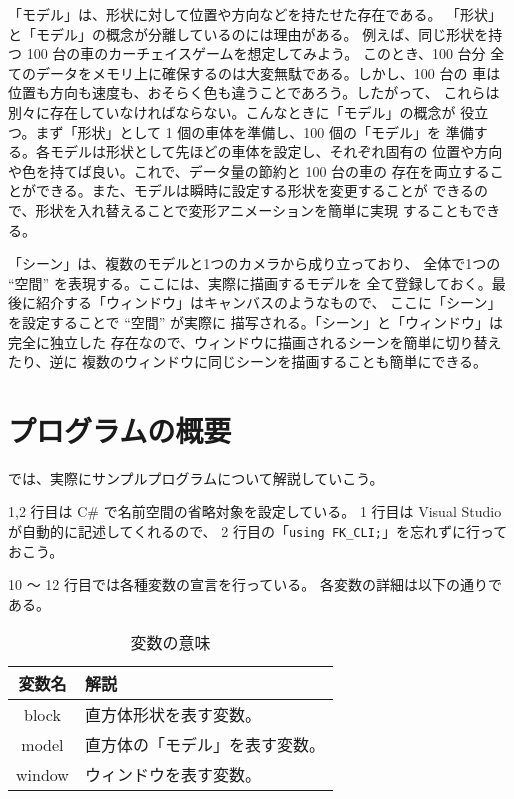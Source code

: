 「モデル」は、形状に対して位置や方向などを持たせた存在である。
「形状」と「モデル」の概念が分離しているのには理由がある。
例えば、同じ形状を持つ 100 台の車のカーチェイスゲームを想定してみよう。
このとき、100 台分
全てのデータをメモリ上に確保するのは大変無駄である。しかし、100 台の
車は位置も方向も速度も、おそらく色も違うことであろう。したがって、
これらは別々に存在していなければならない。こんなときに「モデル」の概念が
役立つ。まず「形状」として 1 個の車体を準備し、100 個の「モデル」を
準備する。各モデルは形状として先ほどの車体を設定し、それぞれ固有の
位置や方向や色を持てば良い。これで、データ量の節約と 100 台の車の
存在を両立することができる。また、モデルは瞬時に設定する形状を変更することが
できるので、形状を入れ替えることで変形アニメーションを簡単に実現
することもできる。

「シーン」は、複数のモデルと1つのカメラから成り立っており、
全体で1つの ``空間'' を表現する。ここには、実際に描画するモデルを
全て登録しておく。最後に紹介する「ウィンドウ」はキャンバスのようなもので、
ここに「シーン」を設定することで ``空間'' が実際に
描写される。「シーン」と「ウィンドウ」は完全に独立した
存在なので、ウィンドウに描画されるシーンを簡単に切り替えたり、逆に
複数のウィンドウに同じシーンを描画することも簡単にできる。

\section{プログラムの概要}
では、実際にサンプルプログラムについて解説していこう。

1,2 行目は C\# で名前空間の省略対象を設定している。
1 行目は Visual Studio が自動的に記述してくれるので、
2 行目の「\verb+using FK_CLI;+」を忘れずに行っておこう。

10 〜 12 行目では各種変数の宣言を行っている。
各変数の詳細は以下の通りである。

\begin{table}[H]
\caption{変数の意味}
\label{tbl:samp1}
\begin{center}
\begin{tabular}{|c|l|}
\hline
変数名 & 解説 \\ \hline \hline
block & 直方体形状を表す変数。\\ \hline
model & 直方体の「モデル」を表す変数。\\ \hline
window & ウィンドウを表す変数。\\ \hline
\end{tabular}
\end{center}
\end{table}

